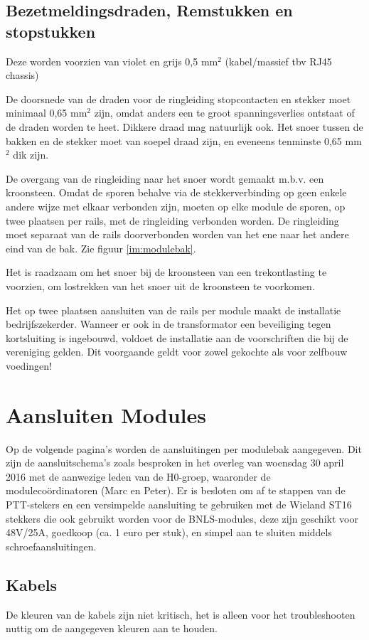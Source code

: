 \documentclass[12pt,a4paper]{report}
\begin{document}
\subsection{Bezetmeldingsdraden, Remstukken en stopstukken}
Deze worden voorzien van  violet en grijs  0,5 mm$^{2}$ (kabel/massief tbv RJ45 chassis)

De doorsnede van de draden voor de ringleiding stopcontacten en stekker moet minimaal 0,65 mm$^{2}$ zijn, omdat anders een te groot spanningsverlies ontstaat of de draden worden te heet. Dikkere draad mag natuurlijk ook.
Het snoer tussen de bakken en de stekker moet van soepel draad zijn, en eveneens tenminste 0,65 mm$^{2}$ dik zijn.

De overgang van de ringleiding naar het snoer wordt gemaakt m.b.v. een kroonsteen. Omdat de sporen behalve via de stekkerverbinding op geen enkele andere wijze met elkaar verbonden zijn, moeten op elke module de sporen, op twee plaatsen per rails, met de ringleiding verbonden worden. De ringleiding moet separaat van de rails doorverbonden worden van het ene naar het andere eind van de bak. Zie figuur \ref{im:modulebak}.

Het is raadzaam om het snoer bij de kroonsteen van een trekontlasting te voorzien, om lostrekken van het snoer uit de kroonsteen te voorkomen.

Het op twee plaatsen aansluiten van de rails per module maakt de installatie bedrijfszekerder. Wanneer er ook in de transformator een beveiliging tegen kortsluiting is ingebouwd, voldoet de installatie aan de voorschriften die bij de vereniging gelden. Dit voorgaande geldt voor zowel gekochte als voor zelfbouw voedingen!

\section{Aansluiten Modules}
Op de volgende pagina's worden de aansluitingen per modulebak aangegeven.
Dit zijn de aansluitschema's zoals besproken in het overleg van woensdag 30 april 2016 met de aanwezige leden van de H0-groep, waaronder de moduleco\"{o}rdinatoren (Marc en Peter).
Er is besloten om af te stappen van de PTT-stekers en een versimpelde aansluiting te gebruiken met de Wieland ST16 stekkers die ook gebruikt worden voor de BNLS-modules, deze zijn geschikt voor 48V/25A, goedkoop (ca. 1 euro per stuk), en simpel aan te sluiten middels schroefaansluitingen.

\subsection{Kabels}
De kleuren van de kabels zijn niet kritisch, het is alleen voor het troubleshooten nuttig om de aangegeven kleuren aan te houden.
\end{document}
